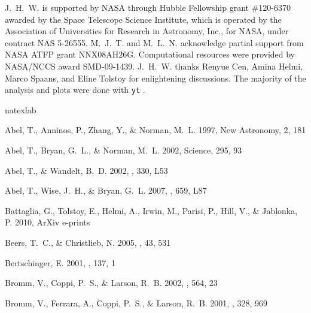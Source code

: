 \documentclass[12pt,preprint]{aastex}
\begin{document}
\acknowledgments

J.~H.~W. is supported by NASA through Hubble Fellowship grant
\#120-6370 awarded by the Space Telescope Science Institute, which is
operated by the Association of Universities for Research in Astronomy,
Inc., for NASA, under contract NAS 5-26555.  M.~J.~T. and
M.~L.~N. acknowledge partial support from NASA ATFP grant NNX08AH26G.
Computational resources were provided by NASA/NCCS award SMD-09-1439.
J.~H.~W. thanks Renyue Cen, Amina Helmi, Marco Spaans, and Eline
Tolstoy for enlightening discussions.  The majority of the analysis
and plots were done with \texttt{yt} \citep{yt_full_paper}.

%
%
\begin{thebibliography}{50}
\expandafter\ifx\csname natexlab\endcsname\relax\def\natexlab#1{#1}\fi

{Abel}, T., {Anninos}, P., {Zhang}, Y., \& {Norman}, M.~L. 1997, New Astronomy,
  2, 181

{Abel}, T., {Bryan}, G.~L., \& {Norman}, M.~L. 2002, Science, 295, 93

{Abel}, T., \& {Wandelt}, B.~D. 2002, \mnras, 330, L53

{Abel}, T., {Wise}, J.~H., \& {Bryan}, G.~L. 2007, \apjl, 659, L87

{Battaglia}, G., {Tolstoy}, E., {Helmi}, A., {Irwin}, M., {Parisi}, P., {Hill},
  V., \& {Jablonka}, P. 2010, ArXiv e-prints

{Beers}, T.~C., \& {Christlieb}, N. 2005, \araa, 43, 531

{Bertschinger}, E. 2001, \apjs, 137, 1

{Bromm}, V., {Coppi}, P.~S., \& {Larson}, R.~B. 2002, \apj, 564, 23

{Bromm}, V., {Ferrara}, A., {Coppi}, P.~S., \& {Larson}, R.~B. 2001, \mnras,
  328, 969


\end{thebibliography}
\end{document}
